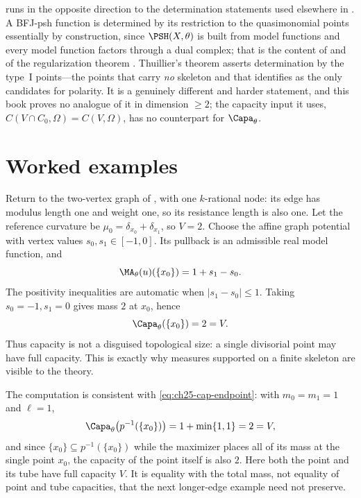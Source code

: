 \begin{remark}
\label{rem:ch25-thuillier-determination}
 runs in the opposite direction to
the determination statements used elsewhere in .  A
BFJ-psh function is determined by its restriction to the quasimonomial
points essentially by construction, since \(\PSH(X,\theta)\) is built from
model functions and every model function factors through a dual complex; that
is the content of  and of the
regularization theorem .  Thuillier's
theorem asserts determination by the type~\(\mathrm{I}\) points---the points
that carry \emph{no} skeleton and that
 identifies as the only candidates for
polarity.  It is a genuinely different and harder statement, and this book
proves no analogue of it in dimension \(\geq2\); the capacity input it uses,
\(C(V\cap C_0,\Omega)=C(V,\Omega)\), has no counterpart for
\(\Capa_\theta\).
\end{remark}

\section{Worked examples}
\label{sec:ch25-worked}

\begin{example}
\label{ex:ch25-two-vertex-full-capacity}
Return to the two-vertex graph of , with one
\(k\)-rational node: its edge has modulus length one and weight one,
so its resistance length is also one.  Let the reference curvature be
\(\mu_0=\delta_{x_0}+\delta_{x_1}\), so \(V=2\).
Choose the affine graph potential with vertex values
\(s_0,s_1\in[-1,0]\).  Its pullback is an admissible real model
function, and
\[
 \MA_\theta(u)(\{x_0\})=1+s_1-s_0.
\]
The positivity inequalities are automatic when \(|s_1-s_0|\leq1\). Taking
\(s_0=-1,s_1=0\) gives mass \(2\) at \(x_0\), hence
\[
                 \Capa_\theta(\{x_0\})=2=V.
\]
Thus capacity is not a disguised topological size: a single divisorial point
may have full capacity. This is exactly why measures supported on a finite
skeleton are visible to the theory.
\end{example}

The computation is consistent with
\eqref{eq:ch25-cap-endpoint}: with \(m_0=m_1=1\) and \(\ell=1\),
\[
 \Capa_\theta\bigl(p^{-1}(\{x_0\})\bigr)=1+\min\{1,1\}=2=V,
\]
and since \(\{x_0\}\subseteq p^{-1}(\{x_0\})\) while the maximizer places all
of its mass at the single point \(x_0\), the capacity of the point itself is
also \(2\).  Here both the point and its tube have full capacity \(V\).
It is equality with the total mass, not equality of point and tube
capacities, that the next longer-edge example need not preserve.

